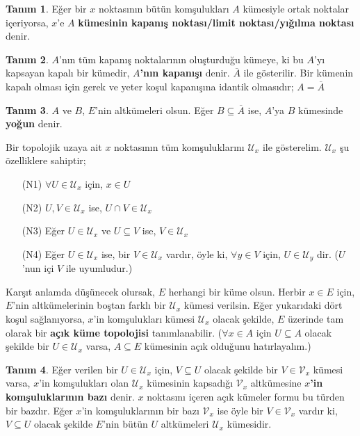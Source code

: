 \documentclass[11pt]{article}
\theoremstyle{plain}
\theoremstyle{definition}
\newtheorem{definition}{Tanım}
\theoremstyle{remark}
\numberwithin{equation}{section}
\renewcommand{\%}{{\small \%}}
\begin{document}
\begin{definition}
Eğer bir $x$ noktasının bütün komşulukları $A$ kümesiyle ortak noktalar içeriyorsa, $x$'e $A$ \textbf{kümesinin kapanış noktası/limit noktası/yığılma noktası} denir.
\end{definition}

\begin{definition}
$A$'nın tüm kapanış noktalarının oluşturduğu kümeye, ki bu $A$'yı kapsayan kapalı bir kümedir, \textbf{$A$'nın kapanışı} denir. $\overline{A}$ ile gösterilir. Bir kümenin kapalı olması için gerek ve yeter koşul kapanışına idantik olmasıdır; $A=\overline{A}$
\end{definition}

\begin{definition}
$A$ ve $B$, $E$'nin altkümeleri olsun. Eğer $B\subseteq \overline{A}$ ise, $A$'ya $B$ kümesinde \textbf{yoğun} denir.
\end{definition}

Bir topolojik uzaya ait $x$ noktasının tüm komşuluklarını $\mathscr{U}_x$ ile gösterelim. $\mathscr{U}_x$ şu özelliklere sahiptir;
\begin{itemize}
\item[(N1)] $\forall U \in \mathscr{U}_x$ için, $x\in U$
\item[(N2)] $U,V\in \mathscr{U}_x$ ise, $U\cap V\in \mathscr{U}_x$
\item[(N3)] Eğer $U\in \mathscr{U}_x$ ve $U\subseteq V$ ise, $V\in \mathscr{U}_x$
\item[(N4)] Eğer $U\in \mathscr{U}_x$ ise, bir $V\in \mathscr{U}_x$ vardır, öyle ki, $\forall y\in V$ için, $U\in \mathscr{U}_y$ dir. ($U$'nun içi $V$ ile uyumludur.)
\end{itemize}
Karşıt anlamda düşünecek olursak, $E$ herhangi bir küme olsun. Herbir $x\in E$ için, $E$'nin altkümelerinin boştan farklı bir $\mathscr{U}_x$ kümesi verilsin. Eğer yukarıdaki dört koşul sağlanıyorsa, $x$'in komşulukları kümesi $\mathscr{U}_x$ olacak şekilde, $E$ üzerinde tam olarak bir \textbf{açık küme topolojisi} tanımlanabilir. ($\forall x\in A$ için $U\subseteq A$ olacak şekilde bir $U\in \mathscr{U}_x$ varsa, $A\subseteq E$ kümesinin açık olduğunu hatırlayalım.)

\begin{definition}
Eğer verilen bir $U\in \mathscr{U}_x$ için, $V\subseteq U$ olacak şekilde bir $V\in \mathscr{V}_x$ kümesi varsa, $x$'in komşulukları olan $\mathscr{U}_x$ kümesinin kapsadığı $\mathscr{V}_x$ altkümesine \textbf{$x$'in komşuluklarının bazı} denir. $x$ noktasını içeren açık kümeler formu bu türden bir bazdır. Eğer $x$'in komşuluklarının bir bazı $ \mathscr{V}_x$ ise öyle bir $V\in\mathscr{V}_x$ vardır ki, $V\subseteq U$ olacak şekilde  $E$'nin bütün $U$ altkümeleri $\mathscr{U}_x$ kümesidir.
\end{definition}
\end{document}

